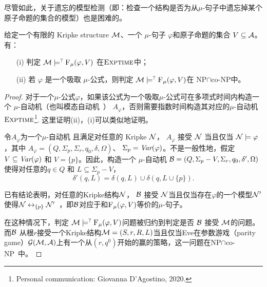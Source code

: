 尽管如此，关于遗忘的模型检测（即：检查一个结构是否为从$\mu$-句子中遗忘掉某个原子命题的集合的模型）也是困难的。
\begin{proposition}\label{chapter06:pro:MC}
	给定一个有限的 Kripke structure  ${\cal M}$、一个 $\mu$-句子 $\varphi$和原子命题的集合 $V\subseteq {\cal A}$。有：
	\begin{itemize}
		\item[(i)] 判定 ${\cal M} \models^? {\textsc{F}_{\textsc{$\mu$}}}(\varphi, V)$ 在$\textsc{Exptime}$中；
		\item[(ii)] 若 $\varphi$ 是一个吸取 $\mu$-公式，则判定 ${\cal M} \models^? {\textsc{F}_{\textsc{$\mu$}}}(\varphi, V)$在 \textsc{NP}$\cap$co-\textsc{NP}中。
	\end{itemize}
\end{proposition}
\begin{proof}
	对于一个$\mu$-公式$\varphi$，如果该公式为一个吸取$\mu$-公式可在多项式时间内构造一个 $\mu$-自动机（也叫模态自动机~\cite{bradfield2018mu}） $A_{\varphi}$，否则需要指数时间构造其对应的$\mu$-自动机$\textsc{Exptime}$\footnote{Personal communication: Giovanna D'Agostino, 2020.}.
	这里证明(ii)，(i)可以类似地证明。
	
	令$A_{\varphi}$为一个$\mu$-自动机 且满足对任意的 Kripke ${\cal N}$， %
	$A_{\varphi}$ 接受 ${\cal N}$ 当且仅当 ${\cal N} \models \varphi$，其中 $A_{\varphi} = (Q, \Sigma_p, \Sigma_r, q_0, \delta, \Omega)$、 $\Sigma_p = \textit{Var}(\varphi)$。不是一般性地，假定$V \subseteq \textit{Var}(\varphi)$ 和 $V=\{p\}$。因此，构造一个 $\mu$-自动机 ${\cal B}= (Q, \Sigma_p - V, \Sigma_r, q_0, \delta', \Omega)$ 使得对任意的$q\in Q$ 和 $L\subseteq \Sigma_p - V$，
	\[
	\delta'(q, L) = \delta(q, L) \cup \delta(q, L \cup \{p\}).
	\]
	
	已有结论表明，对任意的Kripke结构${\cal N}$， ${\cal B}$ 接受 ${\cal N}$当且仅当存在$\varphi$的一个模型${\cal N}'$使得${\cal N} \leftrightarrow_{\{p\}} {\cal N}'$~\cite{d1996uniform}，即${\cal B}$对应于和${\textsc{F}_{\textsc{$\mu$}}}(\varphi, V)$等价的$\mu$-句子。
	
	
	在这种情况下，判定 ${\cal M} \models^? {\textsc{F}_{\textsc{$\mu$}}}(\varphi, V)$问题被归约到判定是否 ${\cal B}$ 接受 ${\cal M}$的问题。
	而${\cal B}$ 从根$r$接受一个Kripke结构${\cal M}=(S, r, R,L)$当且仅当Eve在参数游戏（parity game）${\cal G}({\cal M}, {\cal A})$上有一个从$(r,q^0)$开始的赢的策略，这一问题在\textsc{NP}$\cap$co-\textsc{NP}~\cite{bradfield2018mu}中。
\end{proof}

